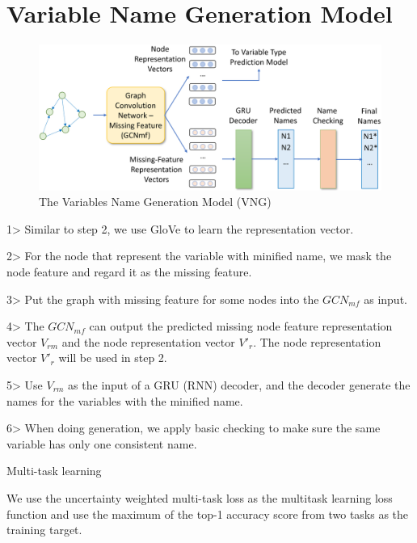 \section{Variable Name Generation Model}
\label{sec:name-gen}

\begin{figure}[ht]
	\begin{center}
	  \includegraphics[width=5.7in]{figures/name-gen-model}
          \vspace{-6pt}
		\caption{The Variables Name Generation Model (VNG)}
		\label{fig:name-gen}
	\end{center}
\end{figure}

1> Similar to step 2, we use GloVe to learn the representation vector.

2> For the node that represent the variable with minified name, we mask the node feature and regard it as the missing feature.

3> Put the graph with missing feature for some nodes into the $GCN_{mf}$ as input. 

4> The $GCN_{mf}$ can output the predicted missing node feature representation vector $V_{rm}$ and the node representation vector $V'_r$. The node representation vector $V'_r$ will be used in step 2.

5> Use $V_{rm}$ as the input of a GRU (RNN) decoder, and the decoder generate the names for the variables with the minified name.

6> When doing generation, we apply basic checking to make sure the same variable has only one consistent name.


Multi-task learning

We use the uncertainty weighted multi-task loss as the multitask learning loss function and use the maximum of the top-1 accuracy score from two tasks as the training target.
